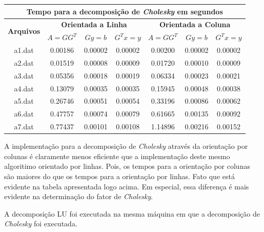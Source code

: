 \documentclass [a4paper,10pt]{article}
\newcommand{\n}[1]{\textbf{#1}}
\begin{document}
{    {\linespread{1}
        \begin{center}
            \begin{tabular}{c c c c c c c}
                \toprule[0.11em]
                \multicolumn{7}{c}{\n{Tempo para a decomposição de \emph{Cholesky} em segundos}}\\
                \midrule
                \multirow{2}{*}{\n{Arquivos}} & \multicolumn{3}{c}{\n{Orientada a Linha}} & \multicolumn{3}{c}{\n{Orientada a Coluna}}\\
                \cmidrule(lr){2-4}
                \cmidrule(l){5-7}
                & \n{$A = GG^T$} & \n{$Gy = b$} & \n{$G^Tx = y$} & \n{$A = GG^T$} & \n{$Gy = b$} & \n{$G^Tx = y$}\\
                \cmidrule(r){1-1}
                \cmidrule(lr){2-2}
                \cmidrule(lr){3-3}
                \cmidrule(lr){4-4}
                \cmidrule(lr){5-5}
                \cmidrule(lr){6-6}
                \cmidrule(l){7-7}
                a1.dat & 0.00186 & 0.00002 & 0.00002 & 0.00200 & 0.00002 & 0.00002\\
                a2.dat & 0.01519 & 0.00008 & 0.00009 & 0.01720 & 0.00010 & 0.00009\\
                a3.dat & 0.05356 & 0.00018 & 0.00019 & 0.06334 & 0.00023 & 0.00021\\
                a4.dat & 0.13079 & 0.00035 & 0.00035 & 0.15945 & 0.00048 & 0.00038\\
                a5.dat & 0.26746 & 0.00051 & 0.00054 & 0.33196 & 0.00086 & 0.00062\\
                a6.dat & 0.47757 & 0.00074 & 0.00079 & 0.61665 & 0.00135 & 0.00092\\
                a7.dat & 0.77437 & 0.00101 & 0.00108 & 1.14896 & 0.00216 & 0.00152\\
                \toprule[0.11em]
            \end{tabular}
    \end{center}}

    A implementação para a decomposição de \emph{Cholesky} através da orientação por colunas é claramente menos eficiente
    que a implementação deste mesmo algoritimo orientado por linhas. Pois, os tempos para a orientação por
    colunas são maiores do que os tempos para a orientação por linhas. Fato  que está evidente na tabela apresentada logo
    acima. Em especial, essa diferença é mais evidente na determinação do fator de \emph{Cholesky}.

    A decomposição LU foi executada na mesma máquina em que a decomposição de \emph{Cholesky} foi executada.

}
\end{document}
